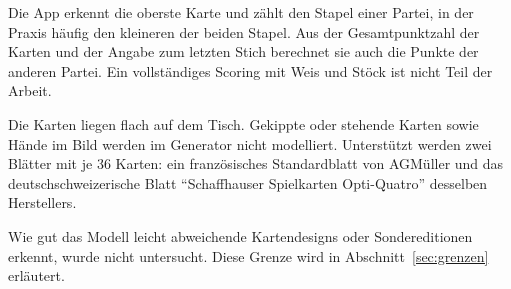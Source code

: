 Die App erkennt die oberste Karte und zählt den Stapel einer Partei, in der
Praxis häufig den kleineren der beiden Stapel. Aus der Gesamtpunktzahl
der Karten und der Angabe zum letzten Stich berechnet sie auch die Punkte
der anderen Partei. Ein vollständiges Scoring mit Weis und Stöck ist
nicht Teil der Arbeit.

Die Karten liegen flach auf dem Tisch. Gekippte oder stehende Karten sowie
Hände im Bild werden im Generator nicht modelliert. Unterstützt werden
zwei Blätter mit je 36 Karten: ein französisches Standardblatt von
AGMüller und das deutschschweizerische Blatt \enquote{Schaffhauser
Spielkarten Opti-Quatro} desselben Herstellers.

Wie gut das Modell leicht abweichende Kartendesigns oder Sondereditionen
erkennt, wurde nicht untersucht. Diese Grenze wird in
Abschnitt~\ref{sec:grenzen} erläutert.
